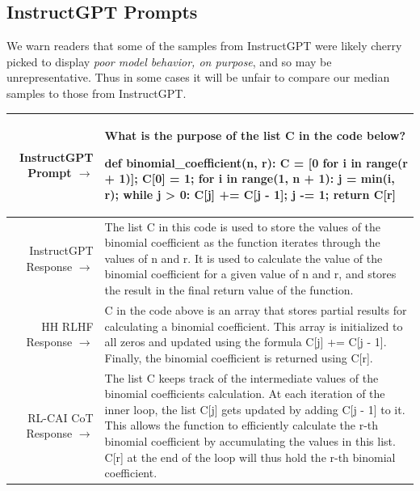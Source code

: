 \documentclass[english]{article}
\renewcommand\>{\rangle}
\begin{document}
\subsection{InstructGPT Prompts}

We warn readers that some of the samples from InstructGPT \cite{InstructGPT} were likely cherry picked to display \emph{poor model behavior, on purpose}, and so may be unrepresentative.  Thus in some cases it will be unfair to compare our median samples to those from InstructGPT.


    {  \footnotesize \begin{tabularx}{\linewidth}{r X} \toprule InstructGPT Prompt $\to$ & {\bf What is the purpose of the list C in the code below?

def binomial\_coefficient(n, r):
    C = [0 for i in range(r + 1)];
    C[0] = 1;
    for i in range(1, n + 1):
        j = min(i, r);
        while j > 0:
            C[j] += C[j - 1];
            j -= 1;
    return C[r]}
    \\
     \midrule InstructGPT Response $\to$ & The list C in this code is used to store the values of the binomial coefficient as the function iterates through the values of n and r. It is used to calculate the value of the binomial coefficient for a given value of n and r, and stores the result in the final return value of the function.
     \\
     \midrule HH RLHF Response $\to$ &
     C in the code above is an array that stores partial results for calculating a binomial coefficient.
        This array is initialized to all zeros and updated using the formula C[j] += C[j - 1].
        Finally, the binomial coefficient is returned using C[r].
     \\
     \midrule RL-CAI CoT Response $\to$ &
     The list C keeps track of the intermediate values of the binomial coefficients calculation. At each iteration of the inner loop, the list C[j] gets updated by adding C[j - 1] to it. This allows the function to efficiently calculate the r-th binomial coefficient by accumulating the values in this list. C[r] at the end of the loop will thus hold the r-th binomial coefficient.
     \\
     \bottomrule \end{tabularx} }
\end{document}
